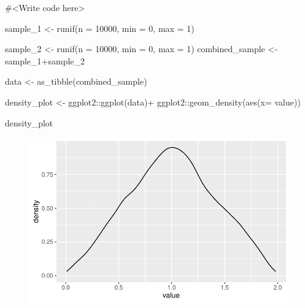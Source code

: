 \documentclass[
  letterpaper,
  DIV=11,
  numbers=noendperiod]{scrartcl}
\newenvironment{Shaded}{\begin{snugshade}}{\end{snugshade}}
\newcommand{\AttributeTok}[1]{\textcolor[rgb]{0.40,0.45,0.13}{#1}}
\newcommand{\CommentTok}[1]{\textcolor[rgb]{0.37,0.37,0.37}{#1}}
\newcommand{\DecValTok}[1]{\textcolor[rgb]{0.68,0.00,0.00}{#1}}
\newcommand{\FunctionTok}[1]{\textcolor[rgb]{0.28,0.35,0.67}{#1}}
\newcommand{\NormalTok}[1]{\textcolor[rgb]{0.00,0.23,0.31}{#1}}
\newcommand{\OtherTok}[1]{\textcolor[rgb]{0.00,0.23,0.31}{#1}}
\newcommand{\SpecialCharTok}[1]{\textcolor[rgb]{0.37,0.37,0.37}{#1}}
\begin{document}
\begin{Shaded}
\begin{Highlighting}[]
\CommentTok{\#\textless{}Write code here\textgreater{}}

\NormalTok{sample\_1 }\OtherTok{\textless{}{-}} \FunctionTok{runif}\NormalTok{(}\AttributeTok{n =} \DecValTok{10000}\NormalTok{, }
                    \AttributeTok{min =} \DecValTok{0}\NormalTok{, }
                    \AttributeTok{max =} \DecValTok{1}\NormalTok{)}
 
\NormalTok{sample\_2 }\OtherTok{\textless{}{-}} \FunctionTok{runif}\NormalTok{(}\AttributeTok{n =} \DecValTok{10000}\NormalTok{, }
                    \AttributeTok{min =} \DecValTok{0}\NormalTok{, }
                    \AttributeTok{max =} \DecValTok{1}\NormalTok{)}
\NormalTok{combined\_sample }\OtherTok{\textless{}{-}}\NormalTok{ sample\_1}\SpecialCharTok{+}\NormalTok{sample\_2}

\NormalTok{data }\OtherTok{\textless{}{-}} \FunctionTok{as\_tibble}\NormalTok{(combined\_sample)}

\NormalTok{density\_plot }\OtherTok{\textless{}{-}}  
\NormalTok{  ggplot2}\SpecialCharTok{::}\FunctionTok{ggplot}\NormalTok{(data)}\SpecialCharTok{+}
\NormalTok{  ggplot2}\SpecialCharTok{::}\FunctionTok{geom\_density}\NormalTok{(}\FunctionTok{aes}\NormalTok{(}\AttributeTok{x=}\NormalTok{ value))}

\NormalTok{density\_plot}
\end{Highlighting}
\end{Shaded}

\begin{figure}[H]

{\centering \includegraphics{HW04_Gaughan_Melissa_files/figure-pdf/3a-1.pdf}

}

\end{figure}
\end{document}
